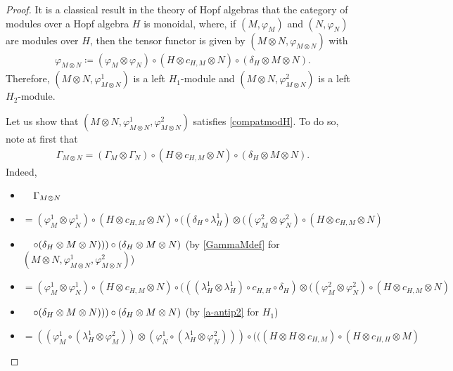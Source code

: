 \documentclass[11pt,reqno]{amsart}
\theoremstyle{plain}%
\theoremstyle{definition}
\theoremstyle{remark}
\begin{document}
\begin{proof}
	It is a classical result in the theory of Hopf algebras that the category of modules over a Hopf algebra $H$ is monoidal, where, if $(M,\varphi_{M})$ and $(N,\varphi_{N})$ are modules over $H$, then the tensor functor is given by $(M\otimes N,\varphi_{M\otimes N})$ with
	\begin{gather*}\label{tensorusualactionhopf}
		\varphi_{M\otimes N}\coloneqq(\varphi_{M}\otimes\varphi_{N})\circ(H\otimes c_{H,M}\otimes N)\circ(\delta_{H}\otimes M\otimes N).\end{gather*}
	Therefore, $(M\otimes N, \varphi_{M\otimes N}^1)$ is a left $H_{1}$-module and $(M\otimes N, \varphi_{M\otimes N}^2)$ is a left $H_{2}$-module.
	
	Let us show that $(M\otimes N,\varphi_{M\otimes N}^{1},\varphi_{M\otimes N}^{2})$ satisfies \eqref{compatmodH}. To do so, note at first that
	\begin{gather}\label{Gammamodtensor}
		\Gamma_{M\otimes N}=(\Gamma_{M}\otimes \Gamma_{N})\circ(H\otimes c_{H,M}\otimes N)\circ(\delta_{H}\otimes M\otimes N).
	\end{gather}
	Indeed,
	\begin{itemize}
		\itemindent=-32pt 
		\item[ ]$\hspace{0.38cm}\Gamma_{M\otimes N}$
		\item[]$=(\varphi_{M}^{1}\otimes\varphi_{N}^{1})\circ(H\otimes c_{H,M}\otimes N)\circ((\delta_{H}\circ\lambda_{H}^{1})\otimes((\varphi_{M}^{2}\otimes\varphi_{N}^{2})\circ(H\otimes c_{H,M}\otimes N)$
		\item[]$\hspace{0.38cm}\circ (\delta_{H}\otimes M\otimes N)))\circ (\delta_{H}\otimes M\otimes N)$ {\footnotesize (by \eqref{GammaMdef} for $(M\otimes N,\varphi_{M\otimes N}^{1},\varphi_{M\otimes N}^{2})$)}
		\item[]$=(\varphi_{M}^{1}\otimes\varphi_{N}^{1})\circ(H\otimes c_{H,M}\otimes N)\circ(((\lambda_{H}^{1}\otimes\lambda_{H}^{1})\circ c_{H,H}\circ\delta_{H})\otimes((\varphi_{M}^{2}\otimes\varphi_{N}^{2})\circ(H\otimes c_{H,M}\otimes N)$
		\item[]$\hspace{0.38cm}\circ (\delta_{H}\otimes M\otimes N)))\circ (\delta_{H}\otimes M\otimes N)$ {\footnotesize (by \eqref{a-antip2} for $H_{1}$)}
		\item[]$=((\varphi_{M}^{1}\circ(\lambda_{H}^{1}\otimes\varphi_{M}^{2}))\otimes(\varphi_{N}^{1}\circ(\lambda_{H}^{1}\otimes\varphi_{N}^{2})))\circ(((H\otimes H\otimes c_{H,M})\circ (H\otimes c_{H,H}\otimes M)$

\end{itemize}
\end{proof}
\end{document}
